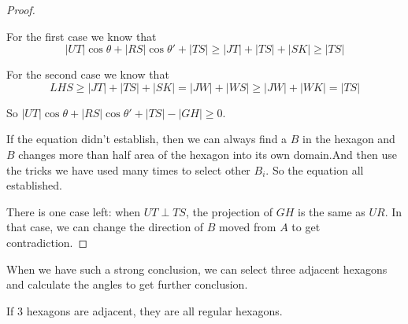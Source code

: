 \begin{proof}
\begin{center}
\end{center}
		
	For the first case we know that 
	\[ |UT|\cos\theta+|RS|\cos\theta' + |TS| \geq |JT| + |TS| + |SK|
	\geq|TS| \]
		
	For the second case we know that
	\[ LHS\geq|JT| + |TS| + |SK| = |JW| + |WS|\geq |JW| + 
	|WK| = |TS| \]
		
	So $|UT|\cos\theta+|RS|\cos\theta'+|TS|-|GH|\geq 0$.
	
	If the equation didn't establish, then we can always find a $B$ 
	in the hexagon and $B$ changes more than half area of the hexagon 
	into its own domain.And then use the tricks we have used many 
	times to select other $B_i$. 
	So the equation all established.
	
	There is one case left: when $UT\perp TS$, the projection of $GH$ 
	is the same as $UR$. In that case, we can change the direction of $B$ 
	moved from $A$ to get contradiction. 
\end{proof}
	
When we have such a strong conclusion, we can select three adjacent 
hexagons and calculate the angles to get further conclusion.
	
\begin{thm}
	If 3 hexagons are adjacent, they are all regular hexagons.
\end{thm}
	
